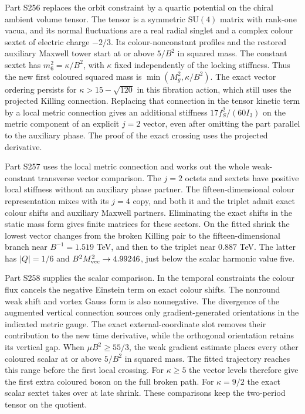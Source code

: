 \documentclass[aps,prd,reprint,onecolumn,nofootinbib,amsmath,amssymb]{revtex4-2}
\begin{document}
Part S256 replaces the orbit constraint by a quartic potential on the chiral ambient volume tensor. The tensor is a symmetric $\mathrm{SU}(4)$ matrix with rank-one vacua, and its normal fluctuations are a real radial singlet and a complex colour sextet of electric charge $-2/3$. Its colour-nonconstant profiles and the restored auxiliary Maxwell tower start at or above $5/B^2$ in squared mass. The constant sextet has $m_6^2=\kappa/B^2$, with $\kappa$ fixed independently of the locking stiffness. Thus the new first coloured squared mass is $\min(M_g^2,\kappa/B^2)$. The exact vector ordering persists for $\kappa>15-\sqrt{120}$ in this fibration action, which still uses the projected Killing connection. Replacing that connection in the tensor kinetic term by a local metric connection gives an additional stiffness $17f_S^2/(60I_3)$ on the metric component of an explicit $j=2$ vector, even after omitting the part parallel to the auxiliary phase. The proof of the exact crossing uses the projected derivative.

Part S257 uses the local metric connection and works out the whole weak-constant transverse vector comparison. The $j=2$ octets and sextets have positive local stiffness without an auxiliary phase partner. The fifteen-dimensional colour representation mixes with its $j=4$ copy, and both it and the triplet admit exact colour shifts and auxiliary Maxwell partners. Eliminating the exact shifts in the static mass form gives finite matrices for these sectors. On the fitted shrink the lowest vector changes from the broken Killing pair to the fifteen-dimensional branch near $B^{-1}=1.519$ TeV, and then to the triplet near $0.887$ TeV. The latter has $|Q|=1/6$ and $B^2M_{\rm vec}^2\to4.99246$, just below the scalar harmonic value five.

Part S258 supplies the scalar comparison. In the temporal constraints the colour flux cancels the negative Einstein term on exact colour shifts. The nonround weak shift and vortex Gauss form is also nonnegative. The divergence of the augmented vertical connection sources only gradient-generated orientations in the indicated metric gauge. The exact external-coordinate slot removes their contribution to the new time derivative, while the orthogonal orientation retains its vertical gap. When $\mu B^2\ge55/3$, the weak gradient estimate places every other coloured scalar at or above $5/B^2$ in squared mass. The fitted trajectory reaches this range before the first local crossing. For $\kappa\ge5$ the vector levels therefore give the first extra coloured boson on the full broken path. For $\kappa=9/2$ the exact scalar sextet takes over at late shrink. These comparisons keep the two-period tensor on the quotient.
\end{document}
